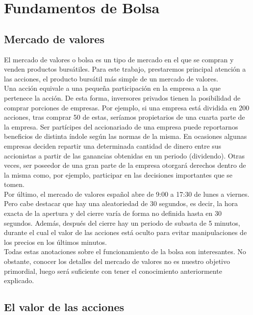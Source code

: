 \section{Fundamentos de Bolsa}
	
		\subsection{Mercado de valores}
		
		El mercado de valores o bolsa es un tipo de mercado en el que se compran y venden productos burs\'atiles. Para este trabajo, prestaremos principal atenci\'on a las acciones, el producto burs\'atil m\'as simple de un mercado de valores.\\
		
		Una acci\'on equivale a una pequeña participaci\'on en la empresa a la que pertenece la acci\'on. De esta forma, inversores privados tienen la posibilidad de comprar porciones de empresas. Por ejemplo, si una empresa est\'a dividida en 200 acciones, tras comprar 50 de estas, ser\'iamos propietarios de una cuarta parte de la empresa. Ser part\'icipes del accionariado de una empresa puede reportarnos beneficios de distinta \'indole seg\'un las normas de la misma. En ocasiones algunas empresas deciden repartir una determinada cantidad de dinero entre sus accionistas a partir de las ganancias obtenidas en un periodo (dividendo). Otras veces, ser poseedor de una gran parte de la empresa otorgar\'a derechos dentro de la misma como, por ejemplo, participar en las decisiones importantes que se tomen.\\
		
		Por \'ultimo, el mercado de valores espa\~nol abre de 9:00 a 17:30 de lunes a viernes. Pero cabe destacar que hay una aleatoriedad de 30 segundos, es decir, la hora exacta de la apertura y del cierre var\'ia de forma no definida hasta en 30 segundos. Además, despu\'es del cierre hay un periodo de subasta de 5 minutos, durante el cual el valor de las acciones est\'a oculto para evitar manipulaciones de los precios en los \'ultimos minutos. \\
		
		Todas estas anotaciones sobre el funcionamiento de la bolsa son interesantes. No obstante, conocer los detalles del mercado de valores no es nuestro objetivo primordial, luego ser\'a suficiente con tener el conocimiento anteriormente explicado.\\
		
		\subsection{El valor de las acciones}
		
